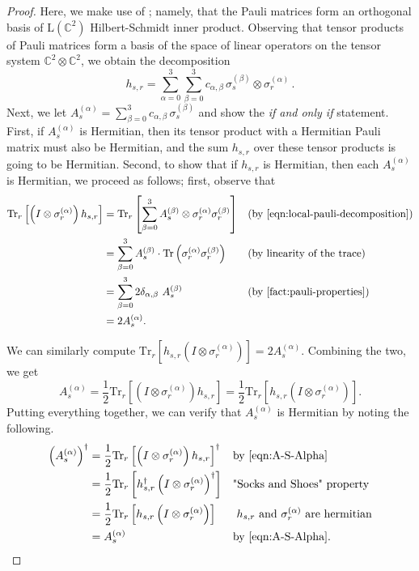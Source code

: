 \documentclass[11pt]{article}
\theoremstyle{plain}
\begin{document}
\begin{proof}
Here, we make use of ; namely, that the Pauli matrices form an orthogonal basis of $\mathrm{L}(\mathbb{C}^{2})$ Hilbert-Schmidt inner product. Observing that tensor products of Pauli matrices form a basis 
of the space of linear operators on the tensor system $\mathbb{C}^{2} \otimes \mathbb{C}^{2}$, we obtain the decomposition
    \[ h_{s,r} = \sum_{\alpha=0}^{3} \sum_{\beta=0}^{3} c_{\alpha, \beta} \, \sigma_s^{(\beta)} \otimes \sigma_r^{(\alpha)} \, .\]
Next, we let $A^{(\alpha)}_s = \sum_{\beta=0}^{3} c_{\alpha, \beta} \, \sigma_s^{(\beta)}$ and show the \emph{if and only if} statement. First, if $A^{(\alpha)}_s$ is Hermitian, then its tensor product with a Hermitian Pauli matrix must also be Hermitian, and the sum $h_{s,r}$ over these tensor products is going to be Hermitian. Second, to show that if $h_{s,r}$ is Hermitian, then each $A^{(\alpha)}_s$ is Hermitian, we proceed as follows; first, observe that
\begin{align}
\mathrm{Tr}_{r}\left[\left(I \otimes \sigma_r^{(\alpha)} \right) h_{s,r} \right] &= \mathrm{Tr}_{r} \left[\sum\limits_{\beta = 0}^{3} A_s^{(\beta)} \otimes \sigma_r^{(\alpha)} \sigma_r^{(\beta)}\right] && \text{(by \Cref{eqn:local-pauli-decomposition})}\\
    &= \sum\limits_{\beta = 0}^{3} A_s^{(\beta)} \cdot \mathrm{Tr}\left(\sigma_r^{(\alpha)} \sigma_r^{(\beta)}\right) && \text{(by linearity of the trace)}\\
    &= \sum\limits_{\beta = 0}^{3} 2\delta_{\alpha, \beta}\ A_s^{(\beta)}&& (\text{by \Cref{fact:pauli-properties}})\\
    &= 2 A_s^{(\alpha)}.
\end{align}

\noindent We can similarly compute $\mathrm{Tr}_{r}\left[ h_{s,r} \left(I \otimes \sigma_r^{(\alpha)} \right)\right] = 2 A_s^{(\alpha)}$. Combining the two, we get
\begin{equation}\label{eqn:A-S-Alpha}
    A_s^{(\alpha)} = \frac{1}{2} \mathrm{Tr}_{r}\left[\left(I \otimes \sigma_r^{(\alpha)} \right) h_{s,r} \right] = \frac{1}{2} \mathrm{Tr}_{r}\left[ h_{s,r} \left(I \otimes \sigma_r^{(\alpha)} \right)\right].
\end{equation}
Putting everything together, we can verify that $A_s^{(\alpha)}$ is Hermitian by noting the following.
\begin{align}
\left(A_s^{(\alpha)}\right)^\dagger &= \frac{1}{2} \mathrm{Tr}_{r}\left[\left(I \otimes \sigma_r^{(\alpha)} \right) h_{s,r} \right]^\dagger && \text{by \Cref{eqn:A-S-Alpha}}\\
    &= \frac{1}{2} \mathrm{Tr}_{r}\left[ h_{s,r}^\dagger \left(I \otimes \sigma_r^{(\alpha)} \right)^\dagger \right] && \text{"Socks and Shoes" property} \\
    &= \frac{1}{2} \mathrm{Tr}_{r}\left[ h_{s,r} \left(I \otimes \sigma_r^{(\alpha)} \right) \right] && \text{ $h_{s,r}$ and $\sigma_r^{(\alpha)}$ are hermitian}\\
    &= A_s^{(\alpha)} && \text{by \Cref{eqn:A-S-Alpha}.}
\end{align}
\end{proof}
\end{document}
